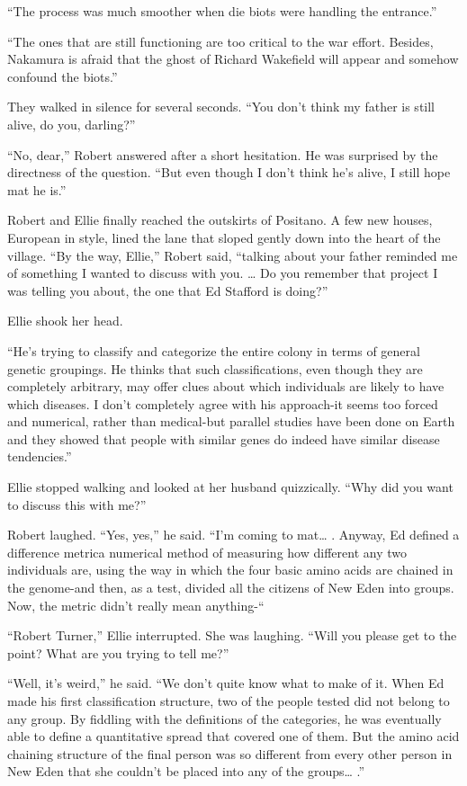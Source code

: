 \documentclass[]{article}
\begin{document}
{{“The process was much smoother when die biots were handling the entrance.”

“The ones that are still functioning are too critical to the war effort.  Besides, Nakamura is afraid that the ghost of Richard Wakefield will appear and somehow confound the biots.”

They walked in silence for several seconds.  “You don’t think my father is still alive, do you, darling?”

“No, dear,” Robert answered after a short hesitation.  He was surprised by the directness of the question.  “But even though I don’t think he’s alive, I still hope mat he is.”

Robert and Ellie finally reached the outskirts of Positano.  A few new houses, European in style, lined the lane that sloped gently down into the heart of the village.  “By the way, Ellie,” Robert said, “talking about your father reminded me of something I wanted to discuss with you.  … Do you remember that project I was telling you about, the one that Ed Stafford is doing?”

Ellie shook her head.

“He’s trying to classify and categorize the entire colony in terms of general genetic groupings.  He thinks that such classifications, even though they are completely arbitrary, may offer clues about which individuals are likely to have which diseases.  I don’t completely agree with his approach-it seems too forced and numerical, rather than medical-but parallel studies have been done on Earth and they showed that people with similar genes do indeed have similar disease tendencies.”

Ellie stopped walking and looked at her husband quizzically.  “Why did you want to discuss this with me?”

Robert laughed.  “Yes, yes,” he said.  “I’m coming to mat… .  Anyway, Ed defined a difference metrica numerical method of measuring how different any two individuals are, using the way in which the four basic amino acids are chained in the genome-and then, as a test, divided all the citizens of New Eden into groups.  Now, the metric didn’t really mean anything-“

“Robert Turner,” Ellie interrupted.  She was laughing.  “Will you please get to the point? What are you trying to tell me?”

“Well, it’s weird,” he said.  “We don’t quite know what to make of it.  When Ed made his first classification structure, two of the people tested did not belong to any group.  By fiddling with the definitions of the categories, he was eventually able to define a quantitative spread that covered one of them.  But the amino acid chaining structure of the final person was so different from every other person in New Eden that she couldn’t be placed into any of the groups… .”

}}
\end{document}
